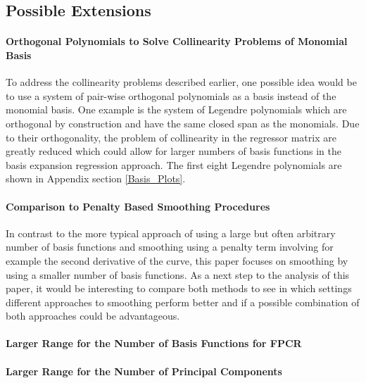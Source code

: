 \documentclass[11pt,twoside,a4paper]{article}
\begin{document}
	\subsection{Possible Extensions}
	
	\paragraph{Orthogonal Polynomials to Solve Collinearity Problems of Monomial Basis}
	To address the collinearity problems described earlier, one possible idea would be to use a system of pair-wise orthogonal polynomials as a basis instead of the monomial basis. One example is the system of Legendre polynomials which are orthogonal by construction and have the same closed span as the monomials. Due to their orthogonality, the problem of collinearity in the regressor matrix are greatly reduced which could allow for larger numbers of basis functions in the basis expansion regression approach. The first eight Legendre polynomials are shown in Appendix section \ref{Basis_Plots}.
	\vspace{-0.2cm}
	
	\paragraph{Comparison to Penalty Based Smoothing Procedures}
	In contrast to the more typical approach of using a large but often arbitrary number of basis functions and smoothing using a penalty term involving for example the second derivative of the curve, this paper focuses on smoothing by using a smaller number of basis functions. As a next step to the analysis of this paper, it would be interesting to compare both methods to see in which settings different approaches to smoothing perform better and if a possible combination of both approaches could be advantageous.
	\vspace{-0.2cm}
	
	\paragraph{Larger Range for the Number of Basis Functions for FPCR}
	\vspace{-0.2cm}
	
	\paragraph{Larger Range for the Number of Principal Components}
	\vspace{-0.2cm}
	
\end{document}
